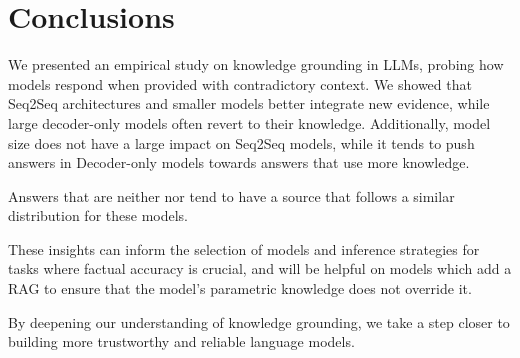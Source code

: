 \section{Conclusions}

We presented an empirical study on knowledge grounding in LLMs, probing how models respond when provided with contradictory context.
We showed that Seq2Seq architectures and smaller models better integrate new evidence, while large decoder-only models often revert to their \Parametric{} knowledge.  Additionally, model size does not have a large impact on Seq2Seq models, while it tends to push answers in Decoder-only models towards answers that use more \Parametric{} knowledge.

Answers that are neither \Parametric{} nor \Contextual{} tend to have a source that follows a similar distribution for these models.

These insights can inform the selection of models and inference strategies for tasks where factual accuracy is crucial, and will be helpful on models which add a RAG to ensure that the model's parametric knowledge does not override it.

By deepening our understanding of knowledge grounding, we take a step closer to building more trustworthy and reliable language models.
